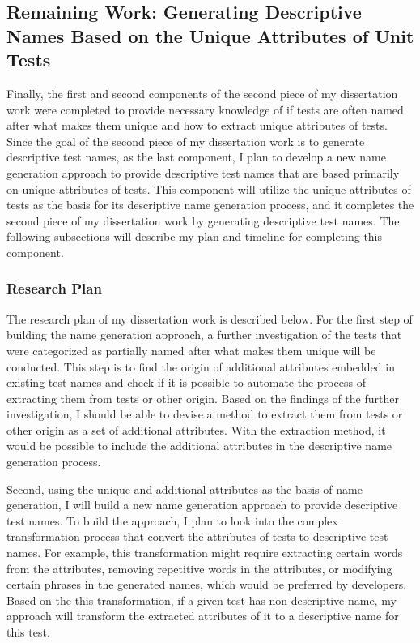 \subsection{Remaining Work: Generating Descriptive Names Based on the Unique Attributes of Unit Tests}
\label{sec:remaining-work}

Finally, the first and second components of the second piece of my dissertation work were completed to provide necessary knowledge of if tests are often named after what makes them unique and how to extract unique attributes of tests.
%
Since the goal of the second piece of my dissertation work is to generate descriptive test names, as the last component, I plan to develop a new name generation approach to provide descriptive test names that are based primarily on unique attributes of tests.
%
This component will utilize the unique attributes of tests as the basis for its descriptive name generation process, and it completes the second piece of my dissertation work by generating descriptive test names.
%
The following subsections will describe my plan and timeline for completing this component.


\subsubsection{Research Plan}

The research plan of my dissertation work is described below.
%
For the first step of building the name generation approach, a further investigation of the tests that were categorized as partially named after what makes them unique will be conducted.
%
This step is to find the origin of additional attributes embedded in existing test names and check if it is possible to automate the process of extracting them from tests or other origin.
%
Based on the findings of the further investigation, I should be able to devise a method to extract them from tests or other origin as a set of additional attributes.
%
With the extraction method, it would be possible to include the additional attributes in the descriptive name generation process.


Second, using the unique and additional attributes as the basis of name generation, I will build a new name generation approach to provide descriptive test names.
%
To build the approach, I plan to look into the complex transformation process that convert the attributes of tests to descriptive test names.
%
For example, this transformation might require extracting certain words from the attributes, removing repetitive words in the attributes, or modifying certain phrases in the generated names, which would be preferred by developers.
%
Based on the this transformation, if a given test has non-descriptive name, my approach will transform the extracted attributes of it to a descriptive name for this test.


